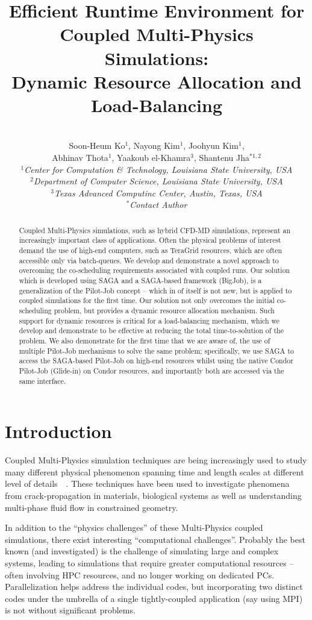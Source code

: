 \documentclass[conference,final]{IEEEtran}
\title{Efficient Runtime Environment for Coupled Multi-Physics Simulations: \\
Dynamic Resource Allocation and Load-Balancing}
\author{
 ~\\[-2em]
 Soon-Heum Ko$^{1}$, Nayong Kim$^{1}$, Joohyun Kim$^{1}$, \\ Abhinav Thota$^{1}$, Yaakoub el-Khamra$^{3}$, Shantenu Jha$^{*1,2}$\\
 \small{\emph{$^{1}$Center for Computation \& Technology, Louisiana State University, USA}}\\
 \small{\emph{$^{2}$Department of Computer Science, Louisiana State University, USA}}\\
 \small{\emph{$^{3}$Texas Advanced Computinc Center, Austin, Texas, USA}}\\
 \small{\emph{$^{*}$Contact Author}}\\
}
\newcommand{\jhanote}[1]{ {\textcolor{red} { ***Jha: #1 }}}
\newcommand{\jhanote}[1]{}
\newcommand{\up}{\vspace*{-1em}}
\begin{document}
\maketitle

\begin{abstract}
 Coupled Multi-Physics simulations, such as hybrid CFD-MD simulations, represent an increasingly important class of applications.  Often the physical problems of interest demand the use of high-end computers, such as TeraGrid resources, which are often accessible only via batch-queues.  We develop and demonstrate a novel approach to overcoming the co-scheduling requirements associated with coupled runs.  Our solution which is developed using SAGA and a SAGA-based framework (BigJob), is a generalization of the Pilot-Job concept -- which in of itself is not new, but is applied to coupled simulations for the first time.  Our solution not only overcomes the initial co-scheduling problem, but provides a dynamic resource allocation mechanism. Such support for dynamic resources is critical for a load-balancing mechanism, which we develop and demonstrate to be effective at reducing the total time-to-solution of the problem.  We also demonstrate for the first time that we are aware of, the use of multiple Pilot-Job mechanisms to solve the same problem; specifically, we use SAGA to access the SAGA-based Pilot-Job on high-end resources whilst using the native Condor Pilot-Job (Glide-in) on Condor resources, and importantly both are accessed via the same interface.
\end{abstract}
\up\up 

\section{Introduction}

Coupled Multi-Physics simulation techniques are being increasingly used to study many different physical phenomenon spanning time and length scales at different level of details~\cite{Tai}~\cite{Watanabe}. These techniques have been used to investigate phenomena from crack-propagation in materials, biological systems as well as understanding multi-phase fluid flow in constrained geometry.

In addition to the ``physics challenges'' of these Multi-Physics coupled simulations, there exist interesting ``computational challenges''.  Probably the best known (and investigated) is the challenge of simulating large and complex systems, leading to simulations that require greater computational resources -- often involving HPC resources, and no longer working on dedicated PCs. Parallelization helps address the individual codes, but incorporating two distinct codes under the umbrella of a single tightly-coupled application (say using MPI) is not without significant problems.  %
\end{document}
